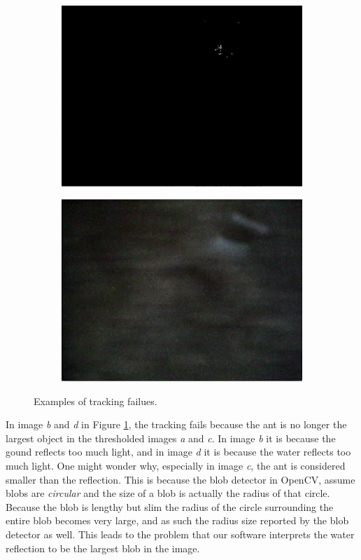 \begin{figure}
\begin{subfigure}[b]{0.35\textwidth}
                \caption{}
        \end{subfigure}\\ \mbox{}\\
        \begin{subfigure}[b]{0.35\textwidth}
                \includegraphics[scale = 0.3]{img/bad4t}
                \caption{}
        \end{subfigure}
		\quad
        \begin{subfigure}[b]{0.35\textwidth}
                \includegraphics[scale = 0.3]{img/bad4}
                \caption{}
        \end{subfigure}
		\caption{Examples of tracking failues.}
		\label{fig:ant_fail}
\end{figure}

In image \emph{b} and \emph{d} in Figure \ref{fig:ant_fail}, the tracking fails because the ant is no longer the largest object in the thresholded images \emph{a} and \emph{c}. In image \emph{b} it is because the gound reflects too much light, and in image \emph{d} it is because the water reflects too much light. One might wonder why, especially in image \emph{c}, the ant is considered smaller than the reflection. This is because the blob detector in OpenCV, assume blobs are \emph{circular} and the size of a blob is actually the radius of that circle. Because the blob is lengthy but slim the radius of the circle surrounding the entire blob becomes very large, and as such the radius size reported by the blob detector as well. This leads to the problem that our software interprets the water reflection to be the largest blob in the image. \\

